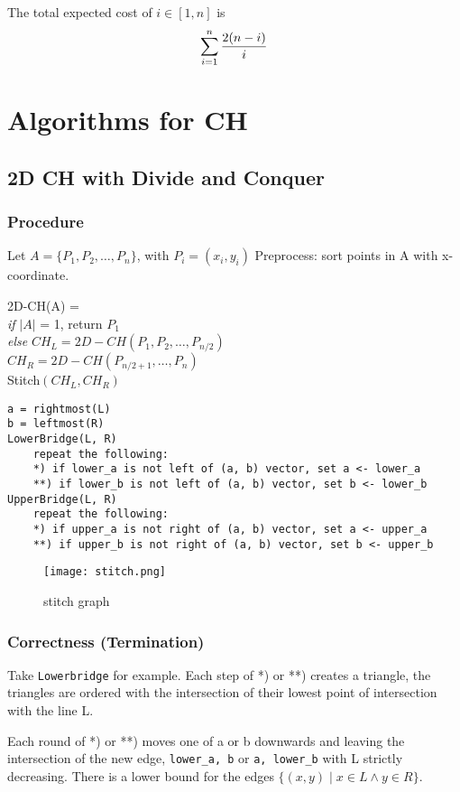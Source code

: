 \documentclass[12pt]{article}
\begin{document}
The total expected cost of $i \in [1, n]$ is 
$$\sum_{i = 1}^n{2(n - i) \over i}$$
\section{Algorithms for CH}
\subsection{2D CH with Divide and Conquer}
\subsubsection{Procedure}
Let $A = \{P_1, P_2, \dots, P_n\}$, with $P_i = (x_i, y_i)$
Preprocess: sort points in A with x-coordinate.
\begin{listing}
2D-CH(A) = \\
\emph{if} $|A|$ = 1, return $P_1$ \\
\emph{else} $CH_L = 2D-CH(P_1, P_2, \dots, P_{n/2})$\\
            $CH_R = 2D-CH(P_{n/2 + 1}, \dots, P_{n})$\\
Stitch$(CH_L, CH_R)$
\end{listing}

\begin{verbatim}
a = rightmost(L)
b = leftmost(R)
LowerBridge(L, R)
    repeat the following:
    *) if lower_a is not left of (a, b) vector, set a <- lower_a
    **) if lower_b is not left of (a, b) vector, set b <- lower_b
UpperBridge(L, R)
    repeat the following:
    *) if upper_a is not right of (a, b) vector, set a <- upper_a
    **) if upper_b is not right of (a, b) vector, set b <- upper_b
\end{verbatim}
\begin{figure}[h!]
  \centering
  \texttt{[image: stitch.png]}
  \caption{stitch graph}
  \label{fig:stitch}
\end{figure}
\subsubsection{Correctness (Termination)}

Take \texttt{Lowerbridge} for example. Each step of *) or **) creates
a triangle, the triangles are ordered with the intersection of their
lowest point of intersection with the line L.

Each round of *) or **) moves one of a or b downwards and leaving the
intersection of the new edge, \texttt{lower\_a, b} or \texttt{a, lower\_b} with L strictly decreasing. There is a lower bound for the
edges $\{(x, y) \mid x \in L \land y \in R\}$.
\end{document}

